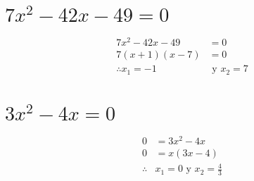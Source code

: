 \documentclass[12pt,addpoints]{evalua}
\begin{document}
\begin{questions}
\begin{multicols}{2}
\begin{parts}
            \part {\Large $7x^2-42x-49=0$}

            \begin{solutionbox}{6cm}
                \begin{align*}
                    7x^2-42x-49           & =0                \\
                    7(x +1)(x-7)          & =0                \\
                    \therefore    x_1 =-1 & \text{ y } x_2 =7
                \end{align*}
            \end{solutionbox}


            \part {\Large $3x^2-4x=0$}

            \begin{solutionbox}{4cm}
                \begin{align*}
                    0          & =	      3x^2-4x                    \\
                    0          & =		 x(3x -4)                       \\
                    \therefore & x_1 =0 \text{ y } x_2 =\frac{4}{3}
                \end{align*}
            \end{solutionbox}


\end{parts}
\end{multicols}
\end{questions}
\end{document}
